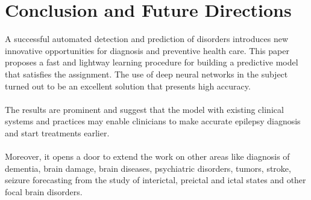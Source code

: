 \documentclass{llncs}       %
\begin{document}
 

\paragraph{}\paragraph{}
\paragraph{}\paragraph{}
\paragraph{}\paragraph{}
\paragraph{}\paragraph{}


\section{Conclusion and Future Directions}
\label{sec:4}



 A successful automated detection and prediction of disorders introduces new innovative opportunities for diagnosis and preventive health care. This paper proposes a fast and lightway learning procedure for building a predictive model that satisfies the assignment. The use of deep neural networks in the subject turned out to be an excellent solution that presents high accuracy.  
\paragraph{}
The results are prominent and suggest that the model with existing clinical systems and practices may enable clinicians to make accurate epilepsy diagnosis and start  treatments earlier.
\paragraph{}
Moreover, it opens a door to extend the work on other areas like diagnosis of dementia, brain damage, brain diseases, psychiatric disorders, tumors, stroke, seizure forecasting from the study of interictal, preictal and ictal states and other focal brain disorders. 
\end{document}
